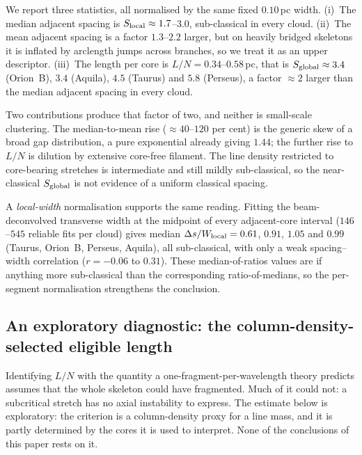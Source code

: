 \documentclass[usenatbib,twoside,twocolumn]{mnras}
\begin{document}
We report three statistics, all normalised by the same fixed $0.10$\,pc width. (i)~The median adjacent spacing is $S_{\rm local}\approx1.7$--$3.0$, sub-classical in every cloud. (ii)~The mean adjacent spacing is a factor $1.3$--$2.2$ larger, but on heavily bridged skeletons it is inflated by arclength jumps across branches, so we treat it as an upper descriptor. (iii)~The length per core is $L/N=0.34$--$0.58$\,pc, that is $S_{\rm global}\approx3.4$ (Orion~B), $3.4$ (Aquila), $4.5$ (Taurus) and $5.8$ (Perseus), a factor $\approx2$ larger than the median adjacent spacing in every cloud.

Two contributions produce that factor of two, and neither is small-scale clustering. The median-to-mean rise ($\approx40$--$120$ per cent) is the generic skew of a broad gap distribution, a pure exponential already giving $1.44$; the further rise to $L/N$ is dilution by extensive core-free filament. The line density restricted to core-bearing stretches is intermediate and still mildly sub-classical, so the near-classical $S_{\rm global}$ is not evidence of a uniform classical spacing.

A \emph{local-width} normalisation supports the same reading. Fitting the beam-deconvolved transverse width at the midpoint of every adjacent-core interval ($146$--$545$ reliable fits per cloud) gives median $\Delta s/W_{\rm local}=0.61$, $0.91$, $1.05$ and $0.99$ (Taurus, Orion~B, Perseus, Aquila), all sub-classical, with only a weak spacing--width correlation ($r=-0.06$ to $0.31$). These median-of-ratios values are if anything more sub-classical than the corresponding ratio-of-medians, so the per-segment normalisation strengthens the conclusion.



\subsection{An exploratory diagnostic: the column-density-selected eligible length}
\label{sec:eligible}

Identifying $L/N$ with the quantity a one-fragment-per-wavelength theory predicts assumes that the whole skeleton could have fragmented. Much of it could not: a subcritical stretch has no axial instability to express. The estimate below is exploratory: the criterion is a column-density proxy for a line mass, and it is partly determined by the cores it is used to interpret. None of the conclusions of this paper rests on it.
\end{document}
